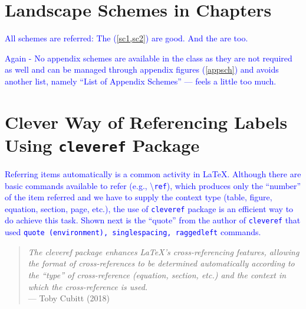 \documentclass[phd,showframe]{ndsu-thesis-2022}
\newcommand\italk[1]{\textcolor{blue}{#1}}  %
\newcommand\cmd[1]{\textbackslash\texttt{#1}}  %
\begin{document}
\vt
\kant[9]


\vspace{-3.5ex}

\vh
\section{Landscape Schemes in Chapters}

\italk{All schemes are referred: The (\cref{sc1,sc2}) are good. And the \Cref{sc1,sc2,sc3} are too.} 

\kant[4]\kant[9]

\italk{Again - No appendix schemes are available in the class as they are not required as well and can be managed through appendix figures (\cref{appsch}) and avoids another list, namely ``List of Appendix Schemes'' --- feels a little too much.}




\section{Clever Way of Referencing Labels Using \texttt{cleveref} Package}
\italk{Referring items automatically is a common activity in \LaTeX. Although there are basic commands available to refer (e.g., \cmd{ref}), which produces only the ``number'' of the item referred and we have to supply the context type (table, figure, equation, section, page, etc.), the use of \texttt{cleveref} package is an efficient way to do achieve this task. Shown next is the ``quote'' from the author of \texttt{cleveref} that used \texttt{quote (environment), singlespacing, raggedleft} commands.}

\vspace{-4ex}
\textcolor{magenta}{
\begin{quote}
\singlespacing
\raggedleft
\textit{The cleveref package enhances \LaTeX's cross-referencing features, allowing the format of cross-references to be determined automatically according to the ``type'' of cross-reference (equation, section, etc.) and the context in which the cross-reference is used.} 
\\\hfill --- Toby Cubitt (2018)
\end{quote}
}
\end{document}
